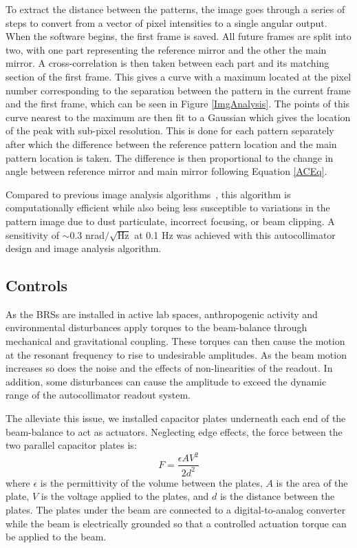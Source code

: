 \documentclass [12pt, proquest]{uwthesis}[2019]
\begin{document}
To extract the distance between the patterns, the image goes through a series of steps to convert from a vector of pixel intensities to a single angular output. When the software begins, the first frame is saved. All future frames are split into two, with one part representing the reference mirror and the other the main mirror. A cross-correlation is then taken between each part and its matching section of the first frame. This gives a curve with a maximum located at the pixel number corresponding to the separation between the pattern in the current frame and the first frame, which can be seen in Figure \ref{ImgAnalysis}. The points of this curve nearest to the maximum are then fit to a Gaussian which gives the location of the peak with sub-pixel resolution. This is done for each pattern separately after which the difference between the reference pattern location and the main pattern location is taken. The difference is then proportional to the change in angle between reference mirror and main mirror following Equation \ref{ACEq}.

Compared to previous image analysis algorithms~\cite{MSA}, this algorithm is computationally efficient while also being less susceptible to variations in the pattern image due to dust particulate, incorrect focusing, or beam clipping. A sensitivity of $\sim$0.3 nrad$/\sqrt{\text{Hz}}$ at 0.1 Hz was achieved with this autocollimator design and image analysis algorithm.

\subsection{Controls}

\quad As the BRSs are installed in active lab spaces, anthropogenic activity and environmental disturbances apply torques to the beam-balance through mechanical and gravitational coupling. These torques can then cause the motion at the resonant frequency to rise to undesirable amplitudes. As the beam motion increases so does the noise and the effects of non-linearities of the readout. In addition, some disturbances can cause the amplitude to exceed the dynamic range of the autocollimator readout system.

The alleviate this issue, we installed capacitor plates underneath each end of the beam-balance to act as actuators. Neglecting edge effects, the force between the two parallel capacitor plates is: 
\begin{equation}
F=\frac{\epsilon A V^2}{2d^2} \label{cap}
\end{equation}
where $\epsilon$ is the permittivity of the volume between the plates, $A$ is the area of the plate, $V$ is the voltage applied to the plates, and $d$ is the distance between the plates. The plates under the beam are connected to a digital-to-analog converter while the beam is electrically grounded so that a controlled actuation torque can be applied to the beam. 
\end{document}
